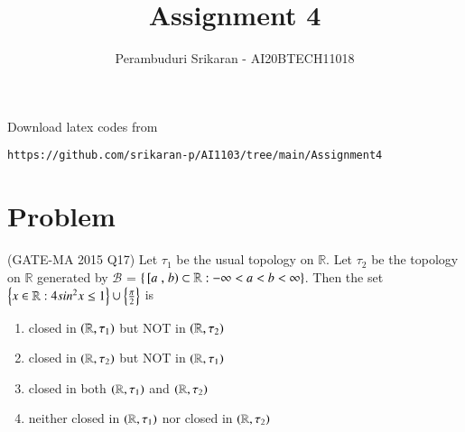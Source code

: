 \documentclass[journal,12pt,twocolumn]{IEEEtran}
\begin{document}
\let\StandardTheFigure\thefigure
\let\vec\mathbf
\renewcommand{\thefigure}{\theproblem}
\def\putbox#1#2#3{\makebox[0in][l]{\makebox[#1][l]{}\raisebox{\baselineskip}[0in][0in]{\raisebox{#2}[0in][0in]{#3}}}}
     \def\rightbox#1{\makebox[0in][r]{#1}}
     \def\centbox#1{\makebox[0in]{#1}}
     \def\topbox#1{\raisebox{-\baselineskip}[0in][0in]{#1}}
     \def\midbox#1{\raisebox{-0.5\baselineskip}[0in][0in]{#1}}
\vspace{3cm}
\title{Assignment 4}
\author{Perambuduri Srikaran - AI20BTECH11018}
\maketitle
\newpage
\bigskip
\renewcommand{\thefigure}{\theenumi}
\renewcommand{\thetable}{\theenumi}
Download latex codes from
\begin{lstlisting}
https://github.com/srikaran-p/AI1103/tree/main/Assignment4
\end{lstlisting}
\section*{Problem}
(GATE-MA 2015 Q17) Let $\tau_1$ be the usual topology on $\mathbb{R}$. Let $\tau_2$ be the topology on $\mathbb{R}$ generated by $\mathcal{B}$ = $\left\{{}\left[a\right., \left.b\right) \subset \mathbb{R} : -\infty < a < b < \infty\right\}$. Then the set $\left\{x \in \mathbb{R} : 4sin^2x \leq 1\right\} \cup \left\{\frac{\pi}{2}\right\}$ is
\begin{enumerate}[label={(\Alph*)}]
    \item closed in $\left(\mathbb{R}, \tau_1\right)$ but NOT in $\left(\mathbb{R}, \tau_2\right)$
    \item closed in $\left(\mathbb{R}, \tau_2\right)$ but NOT in $\left(\mathbb{R}, \tau_1\right)$
    \item closed in both $\left(\mathbb{R}, \tau_1\right)$ and $\left(\mathbb{R}, \tau_2\right)$
    \item neither closed in $\left(\mathbb{R}, \tau_1\right)$ nor closed in $\left(\mathbb{R}, \tau_2\right)$
\end{enumerate}
\end{document}
